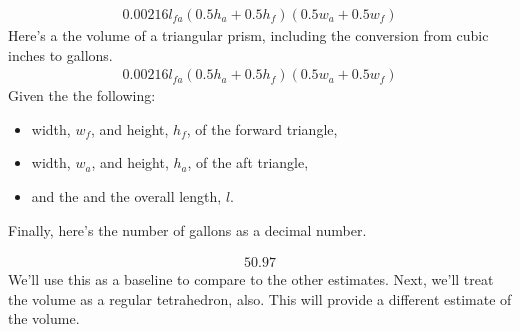 \documentclass[letterpaper,10pt,english]{sphinxmanual}
\begin{document}
\begin{sphinxVerbatim}[commandchars=\\\{\}]
 
\end{sphinxVerbatim}
\begin{equation*}
\begin{split}\displaystyle 0.00216 l_{fa} \left(0.5 h_{a} + 0.5 h_{f}\right) \left(0.5 w_{a} + 0.5 w_{f}\right)\end{split}
\end{equation*}
\sphinxAtStartPar
Here’s a the volume of a triangular prism, including the conversion from cubic inches to gallons.
\begin{equation}\label{equation:README:prism_mid}
\begin{split}\displaystyle 0.00216 l_{fa} \left(0.5 h_{a} + 0.5 h_{f}\right) \left(0.5 w_{a} + 0.5 w_{f}\right)\end{split}
\end{equation}
\sphinxAtStartPar
Given the the following:
\begin{itemize}
\item {} 
\sphinxAtStartPar
width, \(w_f\), and height, \(h_f\), of the forward triangle,

\item {} 
\sphinxAtStartPar
width, \(w_a\), and height, \(h_a\), of the aft triangle,

\item {} 
\sphinxAtStartPar
and the and the overall length, \(l\).

\end{itemize}

\sphinxAtStartPar
Finally, here’s the number of gallons as a decimal number.

\begin{sphinxVerbatim}[commandchars=\\\{\}]
 
\end{sphinxVerbatim}
\begin{equation*}
\begin{split}\displaystyle 50.97\end{split}
\end{equation*}
\sphinxAtStartPar
We’ll use this as a baseline to compare to the other estimates.  Next, we’ll treat the volume as a regular tetrahedron, also. This will provide a different estimate of the volume.
\end{document}

